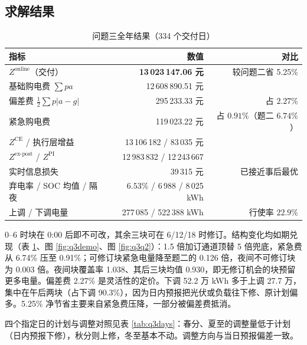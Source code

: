 \documentclass[12pt,a4paper]{ctexart}
\newcommand{\Zon}{Z^{\mathrm{online}}}
\newcommand{\ZCE}{Z^{\mathrm{CE}}}
\newcommand{\Zep}{Z^{\mathrm{ex\text{-}post}}}
\newcommand{\ZPI}{Z^{\mathrm{PI}}}
\begin{document}
\subsection{求解结果}

\begin{table}[H]
\centering\small
\caption{问题三全年结果（334 个交付日）}
\begin{tabular}{lrr}
\toprule
指标 & 数值 & 对比 \\
\midrule
$\Zon$（交付） & \textbf{13\,023\,147.06 元} & 较问题二省 5.25\% \\
\quad 基础购电费 $\sum pa$ & 12\,608\,890.51 元 & \\
\quad 偏差费 $\tfrac12\sum p|a-g|$ & 295\,233.33 元 & 占 $2.27\%$ \\
\quad 紧急购电费 & 119\,023.22 元 & 占 $0.91\%$（题二 $6.74\%$） \\
$\ZCE$ / 执行层增益 & 13\,106\,182 / 83\,035 元 & \\
$\Zep$ / $\ZPI$ & 12\,983\,832 / 12\,243\,667 & \\
实时信息损失 & 39\,315 元 & 已接近事后最优 \\
弃电率 / SOC 均值 / 隔夜 & $6.53\%$ / 6\,988 / 8\,025 kWh & \\
上调 / 下调电量 & 277\,085 / 522\,388 kWh & 行使率 $22.9\%$ \\
\bottomrule
\end{tabular}
\label{tab:q3res}
\end{table}

0--6 时块在 0:00 后即不可改，其余三块可在 6/12/18 时修订。结构变化均如期兑现（表 \ref{tab:q3res}、图 \ref{fig:q3demo}、图 \ref{fig:q3q2}）：1.5 倍加订通道顶替 5 倍兜底，紧急费从 6.74\% 压至 0.91\%；可修订块紧急电量降至题二的 0.126 倍，夜间不可修订块为 0.003 倍。夜间块覆盖率 1.038、其后三块均值 0.930，即无修订机会的块预留更多电量。偏差费 2.27\% 是灵活性的定价。下调 52.2 万 kWh 多于上调 27.7 万，集中在午后两块（占下调 90.3\%），因为日内预报把光伏或负载往下修、原计划偏多。5.25\% 净节省主要来自紧急费压降，一部分被偏差费抵消。

四个指定日的计划与调整对照见表 \ref{tab:q3days}：春分、夏至的调整量低于计划（日内预报下修），秋分则上修，冬至基本不动。调整方向与当日预报偏差一致。
\end{document}
